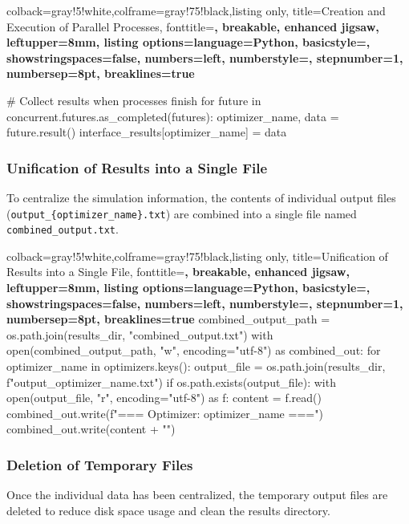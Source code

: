\begin{tcblisting}{colback=gray!5!white,colframe=gray!75!black,listing only,
    title=Creation and Execution of Parallel Processes, fonttitle=\bfseries, breakable, enhanced jigsaw, leftupper=8mm,
    listing options={language=Python, basicstyle=\ttfamily\small,
    showstringspaces=false, numbers=left, numberstyle=\footnotesize,
    stepnumber=1, numbersep=8pt, breaklines=true}}

# Collect results when processes finish
for future in concurrent.futures.as_completed(futures):
    optimizer_name, data = future.result()
    interface_results[optimizer_name] = data
\end{tcblisting}

\subsubsection{Unification of Results into a Single File}
To centralize the simulation information, the contents of individual output files (\texttt{output\_\{optimizer\_name\}.txt}) are combined into a single file named \texttt{combined\_output.txt}.

\begin{tcblisting}{colback=gray!5!white,colframe=gray!75!black,listing only,
    title=Unification of Results into a Single File, fonttitle=\bfseries, breakable, enhanced jigsaw, leftupper=8mm,
    listing options={language=Python, basicstyle=\ttfamily\small,
    showstringspaces=false, numbers=left, numberstyle=\footnotesize,
    stepnumber=1, numbersep=8pt, breaklines=true}}
combined_output_path = os.path.join(results_dir, "combined_output.txt")
with open(combined_output_path, "w", encoding="utf-8") as combined_out:
    for optimizer_name in optimizers.keys():
        output_file = os.path.join(results_dir, f"output_{optimizer_name}.txt")
        if os.path.exists(output_file):
            with open(output_file, "r", encoding="utf-8") as f:
                content = f.read()
            combined_out.write(f"=== Optimizer: {optimizer_name} ===\n")
            combined_out.write(content + "\n")
\end{tcblisting}

\subsubsection{Deletion of Temporary Files}
Once the individual data has been centralized, the temporary output files are deleted to reduce disk space usage and clean the results directory.

